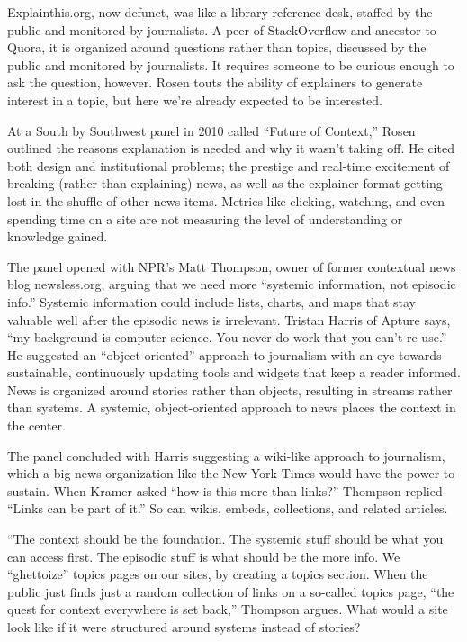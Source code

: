 Explainthis.org, now defunct, was like a library reference desk, staffed by the public and monitored by journalists. A peer of StackOverflow and ancestor to Quora, it is organized around questions rather than topics, discussed by the public and monitored by journalists. It requires someone to be curious enough to ask the question, however. Rosen touts the ability of explainers to generate interest in a topic, but here we're already expected to be interested.

At a South by Southwest panel in 2010 called ``Future of Context,'' Rosen outlined the reasons explanation is needed and why it wasn't taking off. He cited both design and institutional problems; the prestige and real-time excitement of breaking (rather than explaining) news, as well as the explainer format getting lost in the shuffle of other news items.\autocite{rosen_2010} Metrics like clicking, watching, and even spending time on a site are not measuring the level of understanding or knowledge gained.

The panel opened with NPR's Matt Thompson, owner of former contextual news blog newsless.org, arguing that we need more ``systemic information, not episodic info.'' Systemic information could include lists, charts, and maps that stay valuable well after the episodic news is irrelevant. Tristan Harris of Apture says, ``my background is computer science. You never do work that you can't re-use.'' He suggested an ``object-oriented'' approach to journalism with an eye towards sustainable, continuously updating tools and widgets that keep a reader informed. News is organized around stories rather than objects, resulting in streams rather than systems. A systemic, object-oriented approach to news places the context in the center.

The panel concluded with Harris suggesting a wiki-like approach to journalism, which a big news organization like the New York Times would have the power to sustain. When Kramer asked ``how is this more than links?'' Thompson replied ``Links can be part of it.'' So can wikis, embeds, collections, and related articles.


``The context should be the foundation. The systemic stuff should be what you can access first. The episodic stuff is what should be the more info. We “ghettoize” topics pages on our sites, by creating a topics section. When the public just finds just a random collection of links on a so-called topics page, “the quest for context everywhere is set back,” Thompson argues. What would a site look like if it were structured around systems instead of stories?


